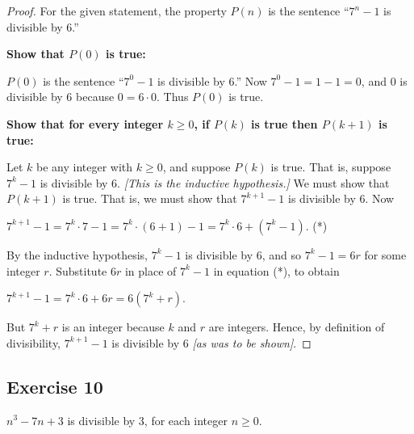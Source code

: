 \documentclass[14pt]{extarticle}
\begin{document}
\begin{proof}
    For the given statement, the property $P(n)$ is the sentence “$7^n - 1$ is divisible by 6.”

    {\bf Show that $P(0)$ is true:}

    $P(0)$ is the sentence “$7^0 - 1$ is divisible by 6.” Now $7^0 - 1 = 1 - 1 = 0$, and 0 is divisible by 6 because $0 = 6 \cdot 0$. Thus $P(0)$ is true.

        {\bf Show that for every integer $k \geq 0$, if $P(k)$ is true then $P(k + 1)$ is true:}

    Let $k$ be any integer with $k \geq 0$, and suppose $P(k)$ is true. That is, suppose $7^k - 1$ is divisible by 6. {\it [This is the inductive hypothesis.]} We must show that $P(k + 1)$ is true. That is, we must show that $7^{k + 1} - 1$ is divisible by 6. Now

    $7^{k + 1} - 1 = 7^k \cdot 7 - 1 = 7^k \cdot (6 + 1) - 1 = 7^k \cdot 6 + (7^k - 1)$. (*)

    By the inductive hypothesis, $7^k - 1$ is divisible by 6, and so $7^k - 1 = 6r$ for some integer $r$. Substitute $6r$ in place of $7^k - 1$ in equation (*), to obtain

    $7^{k + 1} - 1 = 7^k \cdot 6 + 6r = 6(7^k + r)$.

    But $7^k + r$ is an integer because $k$ and $r$ are integers. Hence, by definition of divisibility, $7^{k + 1} - 1$ is divisible by 6 {\it [as was to be shown]}.
\end{proof}

\subsection{Exercise 10}
$n^3 - 7n + 3$ is divisible by 3, for each integer $n \geq 0$.
\end{document}
